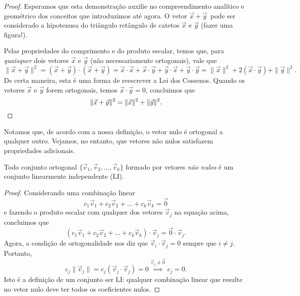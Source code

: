\documentclass[../livro.tex]{subfiles}  %
\begin{document}
\begin{proof}
	Esperamos que esta demonstração auxilie no compreendimento analítico e geométrico dos conceitos que introduzimos até agora. O vetor $\vec{x} + \vec{y} \,$ pode ser considerado a hipotenusa do triângulo retângulo de catetos $\vec{x}$ e $\vec{y}$ (fazer uma figura!).
	
	Pelas propriedades do comprimento e do produto escalar, temos que, para \textit{quaisquer} dois vetores $\vec{x}$ e $\vec{y}$ (não necessariamente ortogonais), vale que
	\begin{equation}
	\|\vec{x} + \vec{y}\|^2 = (\vec{x} + \vec{y}) \cdot (\vec{x} + \vec{y}) =  \vec{x} \cdot \vec{x} + \vec{x} \cdot \vec{y} +  \vec{y} \cdot \vec{x} +  \vec{y} \cdot \vec{y} = \|\vec{x}\|^2 + 2 (\vec{x} \cdot \vec{y}) + \|\vec{y}\|^2.
	\end{equation} De certa maneira, esta é uma forma de reescrever a Lei dos Cossenos. Quando os vetores $\vec{x}$ e $\vec{y}$ forem ortogonais, temos $\vec{x} \cdot \vec{y} = 0$, concluimos que
	\begin{equation}
	\|\vec{x} + \vec{y}\|^2 = \|\vec{x}\|^2 + \|\vec{y}\|^2. \qedhere
	\end{equation}
\end{proof}


Notamos que, de acordo com a nossa definição, o vetor nulo é ortogonal a qualquer outro. Vejamos, no entanto, que vetores não nulos satisfazem propriedades adicionais.

\begin{theorem}
	Todo conjunto ortogonal $\{\vec{v}_1, \vec{v}_2, \dots, \vec{v}_k\}$ formado por vetores \textit{não nulos} é um conjunto linearmente independente (LI).
\end{theorem}

\begin{proof}
	Considerando uma combinação linear
	\begin{equation}
	c_1 \vec{v}_1 + c_2 \vec{v}_2 + \dots + c_k \vec{v}_k = \vec{0}
	\end{equation} e fazendo o produto escalar com qualquer dos vetores $\vec{v}_j$ na equação acima, concluimos que
	\begin{equation}
	(c_1 \vec{v}_1 + c_2 \vec{v}_2 + \dots + c_k \vec{v}_k ) \cdot \vec{v}_j = \vec{0} \cdot \vec{v}_j.
	\end{equation} Agora, a condição de ortogonalidade nos diz que $\vec{v}_i \cdot \vec{v}_j = 0$ sempre que $i \neq j$. Portanto,
	\begin{equation}
	c_j \| \vec{v}_j \| = c_j (\vec{v}_j \cdot \vec{v}_j) = 0 \stackrel{\vec{v}_j \neq \vec{0}}{\implies} c_j = 0.
	\end{equation} Isto é a definição de um conjunto ser LI: qualquer combinação linear que resulte no vetor nulo deve ter todos os coeficientes nulos.
\end{proof}
\end{document}
